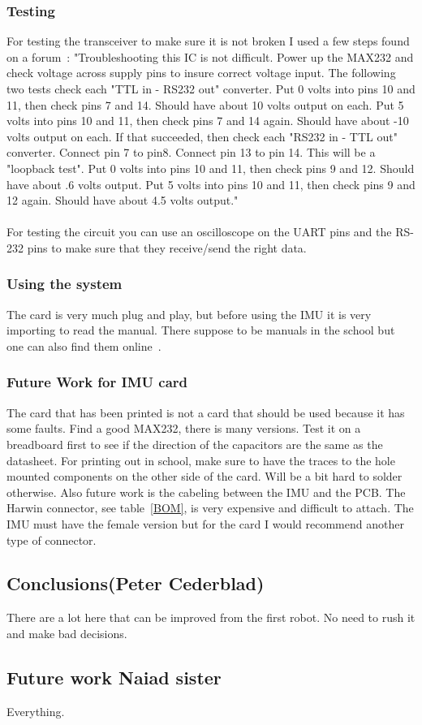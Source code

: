 \subsubsection{Testing}
For testing the transceiver to make sure it is not broken I used a few steps found on a forum~\cite{test}:
"Troubleshooting this IC is not difficult. 
Power up the MAX232 and check voltage across supply pins to insure correct voltage input. 
The following two tests check each "TTL in - RS232 out" converter. 
Put 0 volts into pins 10 and 11, then check pins 7 and 14. Should have about 10 volts output on each. 
Put 5 volts into pins 10 and 11, then check pins 7 and 14 again. Should have about -10 volts output on each. 
If that succeeded, then check each "RS232 in - TTL out" converter. Connect pin 7 to pin8. Connect pin 13 to pin 14. This will be a "loopback test". 
Put 0 volts into pins 10 and 11, then check pins 9 and 12. Should have about .6 volts output. 
Put 5 volts into pins 10 and 11, then check pins 9 and 12 again. Should have about 4.5 volts output."\\
\\
For testing the circuit you can use an oscilloscope on the UART pins and the RS-232 pins to make sure that they receive/send the right data.


\subsubsection{Using the system}
The card is very much plug and play, but before using the IMU it is very importing to read the manual. There suppose to be manuals in the school but one can also find them online~\cite{manual}. 


\subsubsection{Future Work for IMU card}
The card that has been printed is not a card that should be used because it has some faults. Find a good MAX232, there is many versions. Test it on a breadboard first to see if the direction of the capacitors are the same as the datasheet. For printing out in school, make sure to have the traces to the hole mounted components on the other side of the card. Will be a bit hard to solder otherwise.
Also future work is the cabeling between the IMU and the PCB. The Harwin connector, see table~\ref{BOM}, is very expensive and difficult to attach. The IMU must have the female version but for the card I would recommend another type of connector. 



\subsection{Conclusions(Peter Cederblad)}
There are a lot here that can be improved from the first robot. No need to rush it and make bad decisions.

\subsection{Future work Naiad sister}
Everything.